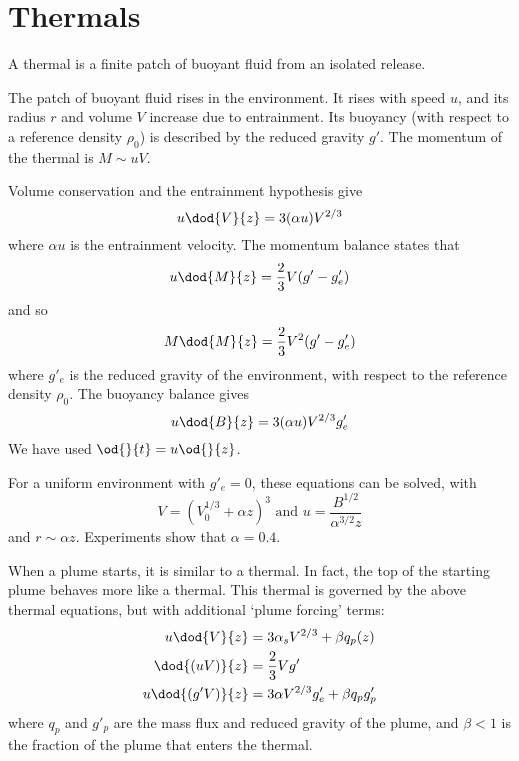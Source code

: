 \section{Thermals}

A thermal is a finite patch of buoyant fluid from an isolated release.

The patch of buoyant fluid rises in the environment. It rises with speed $u$,
and its radius $r$ and volume $V$ increase due to entrainment. Its buoyancy
(with respect to a reference density $\rho_0$) is described by the reduced
gravity $g'$. The momentum of the thermal is $M \sim uV$.

Volume conservation and the entrainment hypothesis give
\begin{equation}
u \dod{V}{z} = 3(\alpha u) V^{2/3}
\end{equation}
where $\alpha u$ is the entrainment velocity.
The momentum balance states that 
\begin{equation}
u \dod{M}{z} = \frac{2}{3} V (g' - g'_e)
\end{equation}
and so
\begin{equation}
M \dod{M}{z} = \frac{2}{3} V^2 (g' - g'_e)
\end{equation}
where $g'_e$ is the reduced gravity of the environment, with respect to the
reference density $\rho_0$. The buoyancy balance gives
\begin{equation}
u \dod{B}{z} = 3 (\alpha u) V^{2/3} g'_e
\end{equation}
We have used $\od{}{t} = u\od{}{z}$. 

For a uniform environment with $g'_e = 0$, these equations can be solved, with
\begin{equation}
V = (V_0^{1/3} + \alpha z)^3 \text{ and } u = \frac{B^{1/2}}{\alpha^{3/2} z}
\end{equation}
and $r \sim \alpha z$. Experiments show that $\alpha = 0.4$.

When a plume starts, it is similar to a thermal. In fact, the top of the
starting plume behaves more like a thermal. This thermal is governed by the
above thermal equations, but with additional `plume forcing' terms:
\begin{align}
u\dod{V}{z} &= 3\alpha_s V^{2/3} + \beta q_p(z)  \\
\dod{(uV)}{z} &= \frac{2}{3} V g' \\
u\dod{(g'V)}{z} &= 3\alpha V^{2/3} g'_e + \beta q_p g'_p
\end{align}
where $q_p$ and $g'_p$ are the mass flux and reduced gravity of the plume, and
$\beta < 1$ is the fraction of the plume that enters the thermal. 

